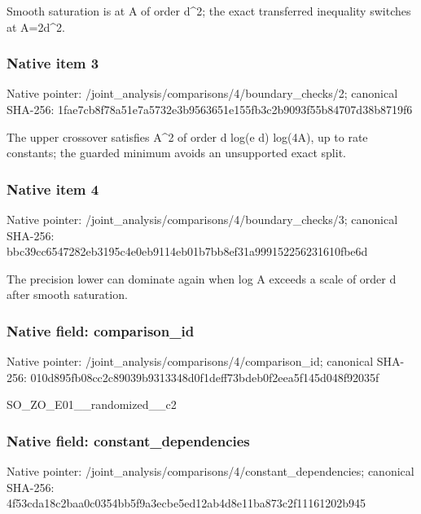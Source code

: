 \documentclass[10pt,a4paper]{article}
\begin{document}
\begingroup\raggedright\sloppy Smooth saturation is at A of order d\textasciicircum{}2;\allowbreak{} the exact transferred inequality switches at A=\allowbreak{}2d\textasciicircum{}2.\par\endgroup

\subsubsection{Native item 3}
Native pointer: /joint\_\allowbreak{}analysis/comparisons/4/boundary\_\allowbreak{}checks/2; canonical SHA-256: 1fae7cb8f78a51e7a5732e3b9563651e155fb3c2b9093f55b84707d38b8719f6

\begingroup\raggedright\sloppy The upper crossover satisfies A\textasciicircum{}2 of order d log(e d) log(4A),\allowbreak{} up to rate constants;\allowbreak{} the guarded minimum avoids an unsupported exact split.\par\endgroup

\subsubsection{Native item 4}
Native pointer: /joint\_\allowbreak{}analysis/comparisons/4/boundary\_\allowbreak{}checks/3; canonical SHA-256: bbc39cc6547282eb3195c4e0eb9114eb01b7bb8ef31a999152256231610fbe6d

\begingroup\raggedright\sloppy The precision lower can dominate again when log A exceeds a scale of order d after smooth saturation.\par\endgroup

\subsubsection{Native field: comparison\_\allowbreak{}id}
Native pointer: /joint\_\allowbreak{}analysis/comparisons/4/comparison\_\allowbreak{}id; canonical SHA-256: 010d895fb08cc2c89039b9313348d0f1deff73bdeb0f2eea5f145d048f92035f

\begingroup\raggedright\sloppy SO\_\allowbreak{}ZO\_\allowbreak{}E01\_\allowbreak{}\_\allowbreak{}randomized\_\allowbreak{}\_\allowbreak{}c2\par\endgroup

\subsubsection{Native field: constant\_\allowbreak{}dependencies}
Native pointer: /joint\_\allowbreak{}analysis/comparisons/4/constant\_\allowbreak{}dependencies; canonical SHA-256: 4f53cda18c2baa0c0354bb5f9a3ecbe5ed12ab4d8e11ba873c2f11161202b945
\end{document}
